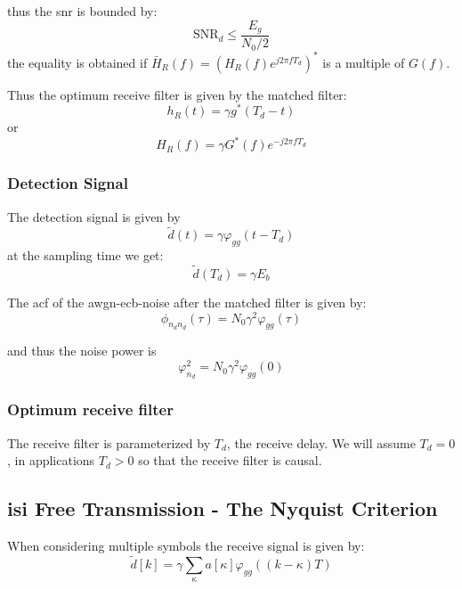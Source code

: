 thus the \ac{snr} is bounded by:
\begin{equation}
    \text{SNR}_d \leq \frac{E_g}{N_0/2}
\end{equation}
the equality is obtained if $\bar{H}_R(f) = {(H_R(f) e^{j 2 \pi f T_d})}^*$ is a multiple
of $G(f)$.

Thus the optimum receive filter is given by the matched filter:
\begin{equation}
    h_R(t) = \gamma g^*(T_d -t)
\end{equation}
or
\begin{equation}
    H_R(f) = \gamma G^*(f) e^{-j 2 \pi f T_d}
\end{equation}

\subsubsection{Detection Signal}
The detection signal is given by
\begin{equation}
    \tilde{d}(t) = \gamma \varphi_{gg}(t- T_d)
\end{equation}
at the sampling time we get:
\begin{equation}
    \tilde{d}(T_d) = \gamma E_b
\end{equation}

The \ac{acf} of the \ac{awgn}-\ac{ecb}-noise after the matched filter is given by:
\begin{equation}
    \phi_{n_d n_d}(\tau) = N_0 \gamma^2 \varphi_{gg}(\tau)
\end{equation}

and thus the noise power is
\begin{equation}
    \varphi_{n_d}^2 = N_0 \gamma^2 \varphi_{gg}(0)
\end{equation}

\subsubsection{Optimum receive filter}
The receive filter is parameterized by $T_d$, the receive delay. We will assume $T_d=0$,
in applications $T_d > 0$ so that the receive filter is causal.

\subsection{\acl{isi} Free Transmission - The Nyquist Criterion}
When considering multiple symbols the receive signal is given by:
\begin{equation}
    \tilde{d}[k] = \gamma \sum_\kappa a[\kappa] \varphi_{gg}((k - \kappa) T)
\end{equation}


